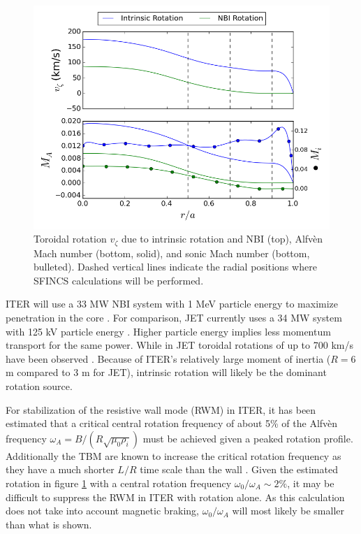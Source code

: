 \documentclass{article}
\begin{document}
\begin{figure}[h!]
\centering
\includegraphics[width=1\textwidth]{rotationestimate.png}
\caption{\label{fig:rotation_estimate} Toroidal rotation $v_{\zeta}$ due to intrinsic rotation and NBI (top), Alfv\`{e}n Mach number  (bottom, solid), and sonic Mach number (bottom, bulleted). Dashed vertical lines indicate the radial positions where SFINCS calculations will be performed. }
\end{figure}

ITER will use a 33 MW NBI system with 1 MeV particle energy to maximize penetration in the core \cite{Poli2014}. For comparison, JET currently uses a 34 MW system with 125 kV particle energy \cite{Ciric2011}. Higher particle energy implies less momentum transport for the same power. While in JET toroidal rotations of up to 700 km/s have been observed \cite{DeVries2008}. Because of ITER's relatively large moment of inertia ($R = 6$ m compared to 3 m for JET), intrinsic rotation will likely be the dominant rotation source. 

For stabilization of the resistive wall mode (RWM) in ITER, it has been estimated that a critical central rotation frequency of about 5\% of the Alfv\`{e}n frequency $\omega_A = B/(R\sqrt{\mu_0 \rho_i})$ must be achieved given a peaked rotation profile. Additionally the TBM are known to increase the critical rotation frequency as they have a much shorter $L/R$ time scale than the wall \cite{Liu2004}. Given the estimated rotation in figure \ref{fig:rotation_estimate} with a central rotation frequency $\omega_0/\omega_A \sim 2\%$, it may be difficult to suppress the RWM in ITER with rotation alone. As this calculation does not take into account magnetic braking, $\omega_0/\omega_A$ will most likely be smaller than what is shown. 
\end{document}
